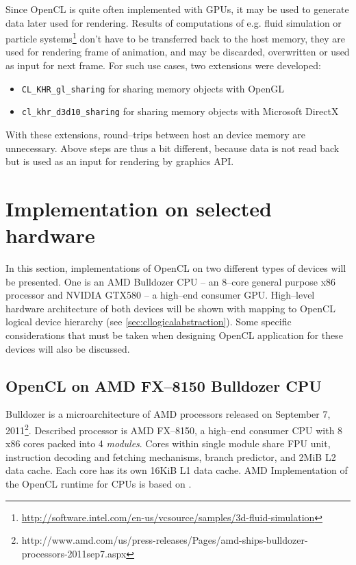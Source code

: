 Since OpenCL is quite often implemented with GPUs, it may be used to generate
data later used for rendering. Results of computations of e.g. fluid simulation
\parencite{Kolb} or particle systems\footnote{\url{http://software.intel.com/en-us/vcsource/samples/3d-fluid-simulation}}
don't have to be transferred back to the host memory, they are used for
rendering frame of animation, and may be discarded, overwritten or used as input
for next frame. For such use cases, two extensions were developed:
\begin{itemize}
  \item \texttt{CL\_KHR\_gl\_sharing} for sharing memory objects with OpenGL
  \item \texttt{cl\_khr\_d3d10\_sharing} for sharing memory objects with Microsoft DirectX
\end{itemize}
With these extensions, round--trips between host an device memory are
unnecessary. Above steps are thus a bit different, because data is not read back
but is used as an input for rendering by graphics API.

\section{Implementation on selected hardware}
\label{sec:climpl}
In this section, implementations of OpenCL on two different types of devices
will be presented. One is an AMD Bulldozer CPU -- an 8--core general purpose x86
processor and NVIDIA GTX580 -- a high--end consumer GPU. High--level hardware
architecture of both devices will be shown with mapping to OpenCL logical
device hierarchy (see \autoref{sec:cllogicalabstraction}). Some specific
considerations that must be taken when designing OpenCL application for these
devices will also be discussed.
\subsection{OpenCL on AMD FX--8150 Bulldozer CPU}

Bulldozer is a microarchitecture of AMD processors released on September 7, 2011\footnote{http://www.amd.com/us/press-releases/Pages/amd-ships-bulldozer-processors-2011sep7.aspx}.
Described processor is AMD FX--8150, a high--end consumer CPU with 8 x86 cores
packed into 4 \emph{modules}. Cores within single module share FPU unit,
instruction decoding and fetching mechanisms, branch predictor, and 2MiB L2 data
cache. Each core has its own 16KiB L1 data cache. AMD Implementation of the OpenCL
runtime for CPUs is based on \cite{gummaraju2010twin}.


